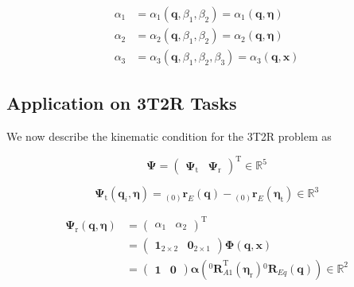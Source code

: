 \documentclass[twocolumn,10pt]{IFTOMM}
\newcommand{\bm}[1]{\boldsymbol{#1}}
\newcommand{\ortvek}[4]{{ }_{(#1)}{\boldsymbol{#2}}^{#3}_{#4} }
\newcommand{\rotmat}[2]{{{ }^{#1}\boldsymbol{R}}_{#2}}
\newcommand{\transp}[0]{{\mathrm{T}}}
\begin{document}
\begin{align}
\alpha_1&=\alpha_1(\bm{q},\beta_1,\beta_2) = \alpha_1(\bm{q},\bm{\eta}) \label{equ:alpha1_dep_beta}\\
\alpha_2&=\alpha_2(\bm{q},\beta_1,\beta_2) = \alpha_2(\bm{q},\bm{\eta}) \label{equ:alpha2_dep_beta}\\
\alpha_3&=\alpha_3(\bm{q},\beta_1,\beta_2,\beta_3) = \alpha_3(\bm{q},\bm{x})  \label{equ:alpha3_dep_beta}
\end{align}


\subsection{Application on 3T2R Tasks}


We now describe the kinematic condition for the 3T2R problem as

\begin{equation}
\bm{\Psi}=\begin{pmatrix}
\bm{\Psi}_{\mathrm{t}} & \bm{\Psi}_{\mathrm{r}}
\end{pmatrix}^\transp \in {\mathbb{R}}^{5}
\end{equation}

\begin{equation}
\bm{\Psi}_{\mathrm{t}}(\bm{q}_i,\bm{\eta}) = \ortvek{0}{r}{}{E}(\bm{q}) - \ortvek{0}{r}{}{E}(\bm{\eta}_{\mathrm{t}}) \in {\mathbb{R}}^{3}
\end{equation}



\begin{align}
\bm{\Psi}_{\mathrm{r}}(\bm{q},\bm{\eta}) &= 
\begin{pmatrix}
\alpha_1  & \alpha_2
\end{pmatrix}^\transp  \\
&=
\begin{pmatrix} \bm{1}_{2 \times 2} & \bm{0}_{2 \times 1}\end{pmatrix} \bm{\Phi} (\bm{q},\bm{x}) \\
&= \begin{pmatrix} \bm{1} & \bm{0}\end{pmatrix} \bm{\alpha}\left(\rotmat{0}{A1}^\transp (\bm{\eta}_{\mathrm{r}})\rotmat{0}{Eq}(\bm{q})\right) \in {\mathbb{R}}^{2}
\end{align}
\end{document}
